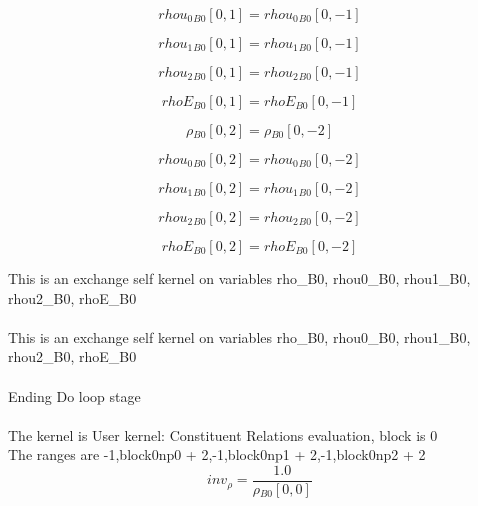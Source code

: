 \documentclass{article}
\begin{document}
\begin{dmath}{rhou_{0}{_{B0}}}[{0,1}] = {rhou_{0}{_{B0}}}[{0,-1}]\end{dmath}

\begin{dmath}{rhou_{1}{_{B0}}}[{0,1}] = {rhou_{1}{_{B0}}}[{0,-1}]\end{dmath}

\begin{dmath}{rhou_{2}{_{B0}}}[{0,1}] = {rhou_{2}{_{B0}}}[{0,-1}]\end{dmath}

\begin{dmath}{rhoE{_{B0}}}[{0,1}] = {rhoE{_{B0}}}[{0,-1}]\end{dmath}

\begin{dmath}{\rho{_{B0}}}[{0,2}] = {\rho{_{B0}}}[{0,-2}]\end{dmath}

\begin{dmath}{rhou_{0}{_{B0}}}[{0,2}] = {rhou_{0}{_{B0}}}[{0,-2}]\end{dmath}

\begin{dmath}{rhou_{1}{_{B0}}}[{0,2}] = {rhou_{1}{_{B0}}}[{0,-2}]\end{dmath}

\begin{dmath}{rhou_{2}{_{B0}}}[{0,2}] = {rhou_{2}{_{B0}}}[{0,-2}]\end{dmath}

\begin{dmath}{rhoE{_{B0}}}[{0,2}] = {rhoE{_{B0}}}[{0,-2}]\end{dmath}

\noindent This is an exchange self kernel on variables rho_B0, rhou0_B0, rhou1_B0, rhou2_B0, rhoE_B0\\\\\noindent This is an exchange self kernel on variables rho_B0, rhou0_B0, rhou1_B0, rhou2_B0, rhoE_B0\\\\\noindent Ending Do loop stage\\
\\\noindent The kernel is User kernel: Constituent Relations evaluation, block is 0\\\noindent The ranges are -1,block0np0 + 2,-1,block0np1 + 2,-1,block0np2 + 2\\\begin{dmath}inv_{\rho} = \frac{1.0}{{\rho{_{B0}}}[{0,0}]}\end{dmath}
\end{document}
